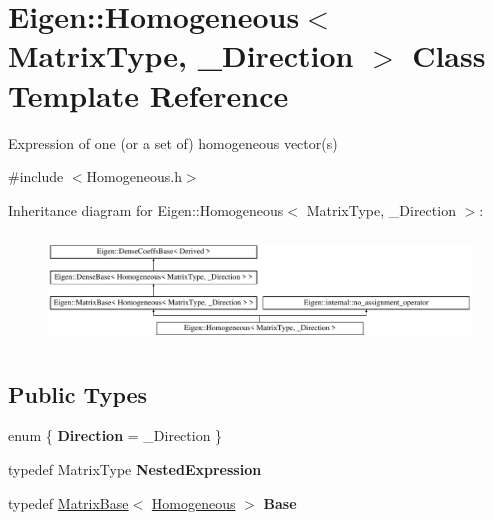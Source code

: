 \hypertarget{class_eigen_1_1_homogeneous}{}\section{Eigen\+::Homogeneous$<$ Matrix\+Type, \+\_\+\+Direction $>$ Class Template Reference}
\label{class_eigen_1_1_homogeneous}


Expression of one (or a set of) homogeneous vector(s)  




{\ttfamily \#include $<$Homogeneous.\+h$>$}

Inheritance diagram for Eigen\+::Homogeneous$<$ Matrix\+Type, \+\_\+\+Direction $>$\+:\begin{figure}[H]
\begin{center}
\leavevmode
\includegraphics[height=2.947368cm]{class_eigen_1_1_homogeneous}
\end{center}
\end{figure}
\subsection*{Public Types}
\begin{DoxyCompactItemize}
\item 
\mbox{\label{class_eigen_1_1_homogeneous_a69455190f16dfd1a81adb89b47f848d4}} 
enum \{ {\bfseries Direction} = \+\_\+\+Direction
 \}
\item 
\mbox{\label{class_eigen_1_1_homogeneous_a357e2dc073a375bbdc8580b0b0aa4ad8}} 
typedef Matrix\+Type {\bfseries Nested\+Expression}
\item 
\mbox{\label{class_eigen_1_1_homogeneous_a895b4459576a9dcab2228c7fe3c563af}} 
typedef \mbox{\hyperlink{class_eigen_1_1_matrix_base}{Matrix\+Base}}$<$ \mbox{\hyperlink{class_eigen_1_1_homogeneous}{Homogeneous}} $>$ {\bfseries Base}
\end{DoxyCompactItemize}

